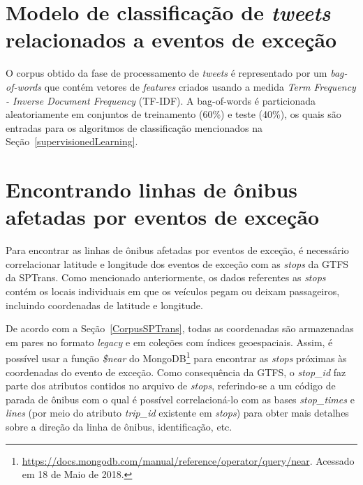 \documentclass[
	12pt,				%
	oneside,			%
	a4paper,			%
	english,			%
	brazil				%
	]{abntex2ppgsi}
\begin{document}
{{{\section{Modelo de classificação de \textit{tweets} relacionados a eventos de exceção}
\label{model}

O corpus obtido da fase de processamento de \textit {tweets} é representado por um \textit{bag-of-words} que contém vetores de \textit{features} criados usando a medida \textit{Term Frequency - Inverse Document Frequency} (TF-IDF). A bag-of-words é particionada aleatoriamente em conjuntos de treinamento (60\%) e teste (40\%), os quais são entradas para os algoritmos de classificação mencionados na Seção~\ref{supervisionedLearning}.

\section{Encontrando linhas de ônibus afetadas por eventos de exceção}

Para encontrar as linhas de ônibus afetadas por eventos de exceção, é necessário correlacionar latitude e longitude dos eventos de exceção com as \textit{stops} da GTFS da SPTrans. Como mencionado anteriormente, os dados referentes as \textit{stops} contém os locais individuais em que os veículos pegam ou deixam passageiros, incluindo coordenadas de latitude e longitude.

De acordo com a Seção~\ref{CorpusSPTrans}, todas as coordenadas são armazenadas em pares no formato \textit{legacy} e em coleções com índices geoespaciais. Assim, é possível usar a função \textit{\$near} do MongoDB\footnote {\url{https://docs.mongodb.com/manual/reference/operator/query/near}. Acessado em 18 de Maio de 2018.}  para encontrar as \textit{stops} próximas às coordenadas do evento de exceção. Como consequência da GTFS, o \textit{stop\_id} faz parte dos atributos contidos no arquivo de \textit{stops}, referindo-se a um código de parada de ônibus com o qual é possível correlacioná-lo com as bases \textit{stop\_times} e \textit{lines} (por meio do atributo \textit{trip\_id} existente em \textit{stops}) para obter mais detalhes sobre a direção da linha de ônibus, identificação, etc.

}}}
\end{document}
